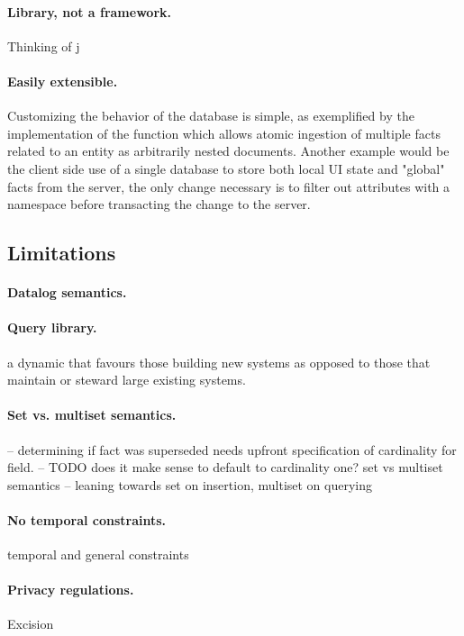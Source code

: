 \paragraph{Library, not a framework.} Thinking of j

\paragraph{Easily extensible.} Customizing the behavior of the database is simple, as exemplified by the implementation of the  function which allows atomic ingestion of multiple facts related to an entity as arbitrarily nested documents. Another example would be the client side use of a single database to store both local \gls{UI} state and "global" facts from the server, the only change necessary is to filter out attributes with a  namespace before transacting the change to the server.


\subsection{Limitations}


\paragraph{Datalog semantics.}


\paragraph{Query library.}

a dynamic that favours those building new systems as opposed to those that maintain or steward large existing systems.

\paragraph{Set vs. multiset semantics.}
-- determining if fact was superseded needs upfront specification of cardinality for field.
-- TODO does it make sense to default to cardinality one?
set vs multiset semantics -- leaning towards set on insertion, multiset on querying


\paragraph{No temporal constraints.} temporal and general constraints

\paragraph{Privacy regulations.} Excision


